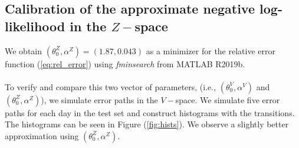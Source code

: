 \documentclass[11pt]{article}
\theoremstyle{definition}
\begin{document}
\subsection{Calibration of the approximate negative log-likelihood in the $Z-$space}

%


We obtain $(\theta_0^Z,\alpha^Z)=(1.87,0.043)$ as a minimizer for the relative error function (\ref{eq:rel_error}) using \textit{fminsearch} from MATLAB R2019b.\\
\quad\\
To verify and compare this two vector of parameters, (i.e., $(\theta_0^V,\alpha^V)$ and $(\theta_0^Z,\alpha^Z)$), we simulate error paths in the $V-$space. We simulate five error paths for each day in the test set and construct histograms with the transitions. The histograms can be seen in Figure (\ref{fig:hists}). We observe a slightly better approximation using $(\theta^Z_0,\alpha^Z)$.
\end{document}
